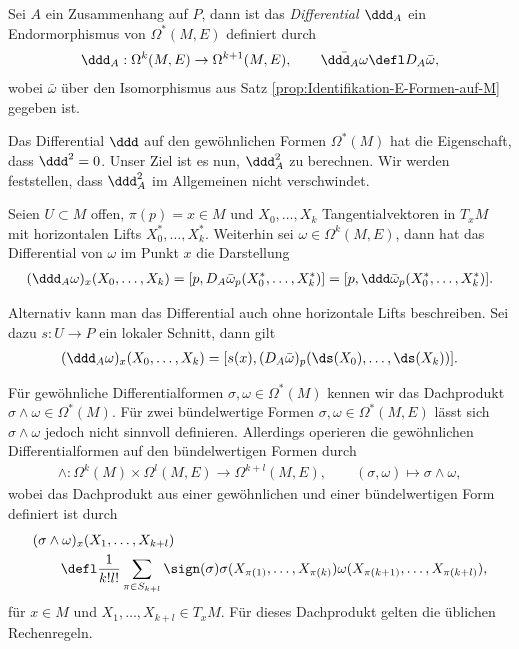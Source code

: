 \documentclass[%
	paper=a5,%
	fleqn,%
	DIV=18,%
	BCOR=0mm,
	fontsize=11pt,
	titlepage=false,%
	bibliography=totoc,
	DIV=18,%
	twoside=true,
	pdftitle=Riemannsche Geometrie,
	pdfauthor=Uwe Semmelmann,
	numbers=noendperiod]%
	{scrbook}
\begin{document}
\begin{defn}
Sei $A$ ein Zusammenhang auf $P$, dann ist das \emph{Differential $\ddd_A$}
ein Endormorphismus von $\Omega^*(M,E)$ definiert durch
\begin{align*}
\ddd_A : \Omega^k(M,E)\to\Omega^{k+1}(M,E),\qquad \bar{\ddd_A \omega} \defl
D_A\bar{\omega},
\end{align*}
wobei $\bar{\omega}$ über den Isomorphismus aus Satz
\ref{prop:Identifikation-E-Formen-auf-M} gegeben ist.\fish
\end{defn}

Das Differential $\ddd$ auf den gewöhnlichen Formen $\Omega^*(M)$ hat die
Eigenschaft, dass $\ddd^2 = 0$. Unser Ziel ist es nun, $\ddd_A^2$ zu
berechnen. Wir werden feststellen, dass $\ddd_A^2$ im Allgemeinen nicht
verschwindet.

\begin{rem}[Bemerkungen.]
\begin{remenum}
\item Seien $U\subset M$ offen, $\pi(p) = x\in M$ und $X_0,\ldots,X_k$
Tangentialvektoren in $T_xM$ mit horizontalen Lifts $X_0^*,\ldots,X_k^*$.
Weiterhin sei $\omega\in\Omega^k(M,E)$, dann hat das Differential von $\omega$
im Punkt $x$ die Darstellung
\begin{align*}
(\ddd_A\omega)_x(X_0,\ldots,X_k) = 
[p,D_A\bar{\omega}_p(X_0^*,\ldots,X_k^*)]= 
[p,\ddd \bar{\omega}_p(X_0^*,\ldots,X_k^*)].
\end{align*}

Alternativ kann man das Differential auch ohne horizontale Lifts beschreiben.
Sei dazu $s: U\to P$ ein lokaler Schnitt, dann gilt
\begin{align*}
(\ddd_A\omega)_x(X_0,\ldots,X_k) = 
[s(x),(D_A \bar{\omega})_p(\ds(X_0),\ldots,\ds(X_k))].
\end{align*}
\item Für gewöhnliche Differentialformen $\sigma,\omega\in\Omega^*(M)$ kennen
wir das Dachprodukt $\sigma\wedge \omega\in\Omega^*(M)$. Für zwei bündelwertige
Formen $\sigma,\omega\in \Omega^*(M,E)$  lässt sich 
$\sigma\wedge\omega$ jedoch nicht sinnvoll definieren. Allerdings operieren
die gewöhnlichen Differentialformen auf den bündelwertigen Formen  durch
\begin{align*}
\wedge : \Omega^k(M)\times \Omega^l(M,E) \to \Omega^{k+l}(M,E),\qquad
(\sigma,\omega) \mapsto \sigma\wedge \omega,
\end{align*}
wobei das Dachprodukt aus einer gewöhnlichen und einer bündelwertigen Form
definiert ist durch
\begin{align*}
&(\sigma\wedge \omega)_x(X_1,\ldots,X_{k+l}) \\ &\qquad \defl 
\frac{1}{k!l!} \sum_{\pi\in S_{k+l}} \sign(\sigma)
\sigma(X_{\pi(1)},\ldots,X_{\pi(k)})\omega(X_{\pi(k+1)},\ldots,X_{\pi(k+l)}),
\end{align*}
für $x\in M$ und $X_1,\ldots,X_{k+l}\in T_xM$. Für dieses Dachprodukt gelten die
üblichen Rechenregeln.\map
\end{remenum}
\end{rem}
\end{document}
